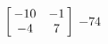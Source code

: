 {$\left[\hskip -3pt \begin{array}{cc} -10&-1\\  -4&7\end {array} \hskip -3pt
 \right]$} 
{$-74$}



  

